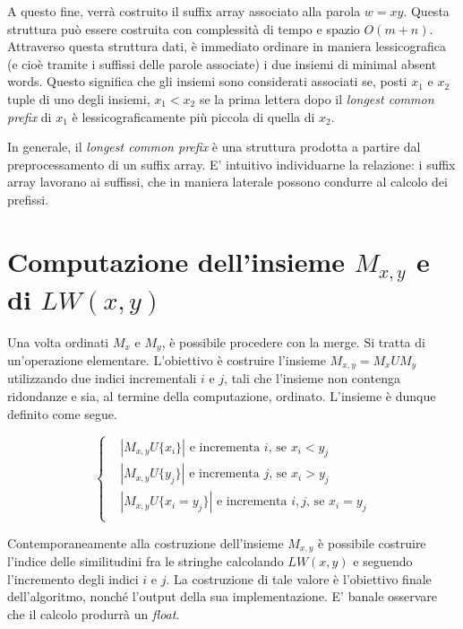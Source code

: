 \vspace{3mm}

A questo fine, verrà costruito il suffix array associato alla parola $w=xy$. Questa struttura può essere costruita con complessità di tempo e spazio $O(m+n)$. Attraverso questa struttura dati, è immediato ordinare in maniera lessicografica (e cioè tramite i suffissi delle parole associate) i due insiemi di minimal absent words. 
Questo significa che gli insiemi sono considerati associati se, posti $x_1$ e $x_2$ tuple di uno degli insiemi, $x_1 < x_2$ se la prima lettera dopo il \textit{longest common prefix} di $x_1$ è lessicograficamente più piccola di quella di $x_2$. 

In generale, il \textit{longest common prefix} è una struttura prodotta a partire dal preprocessamento di un suffix array. E' intuitivo individuarne la relazione: i suffix array lavorano ai suffissi, che in maniera laterale possono condurre al calcolo dei prefissi.

\section{Computazione dell'insieme \(M_{x,y}\) e di \(LW(x,y)\)}

Una volta ordinati $M_x$ e $M_y$, è possibile procedere con la merge. Si tratta di un'operazione elementare. L'obiettivo è costruire l'insieme $M_{x,y} = M_x U M_y$ utilizzando due indici incrementali $i$ e $j$, tali che l'insieme non contenga ridondanze e sia, al termine della computazione, ordinato. L'insieme è dunque definito come segue.

\begin{equation*}
  \left\{
    \begin{aligned}
      & {\left|
        M_{x,y} U \{x_i \}
      \right|} \text{ e incrementa } i\text{, se } x_i < y_j \\
      & {\left|
        M_{x,y} U \{y_j \}
      \right|} \text{ e incrementa } j\text{, se } x_i > y_j \\
      & {\left|
        M_{x,y} U \{x_i = y_j \}
      \right|} \text{ e incrementa } i,j\text{, se } x_i = y_j \\
    \end{aligned}
  \right.
\end{equation*}

Contemporaneamente alla costruzione dell'insieme $M_{x,y}$ è possibile costruire l'indice delle similitudini fra le stringhe calcolando $LW(x,y)$ e seguendo l'incremento degli indici $i$ e $j$. La costruzione di tale valore è l'obiettivo finale dell'algoritmo, nonché l'output della sua implementazione. E' banale osservare che il calcolo produrrà un \textit{float}.

